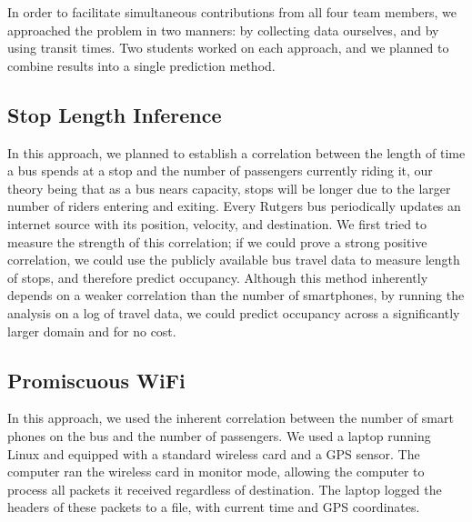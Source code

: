 \documentclass[letterpaper,abstract=on,titlepage=false]{scrreprt}
\begin{document}
In order to facilitate simultaneous contributions from all four team members, we approached the problem in two manners: by collecting data ourselves, and by using transit times.
Two students worked on each approach, and we planned to combine results into a single prediction method.

	\subsection*{Stop Length Inference}

	In this approach, we planned to establish a correlation between the length of time a bus spends at a stop and the number of passengers currently riding it, our theory being that as a bus nears capacity, stops will be longer due to the larger number of riders entering and exiting.
	Every Rutgers bus periodically updates an internet source with its position, velocity, and destination.
	We first tried to measure the strength of this correlation; if we could prove a strong positive correlation, we could use the publicly available bus travel data to measure length of stops, and therefore predict occupancy.
	Although this method inherently depends on a weaker correlation than the number of smartphones, by running the analysis on a log of travel data, we could predict occupancy across a significantly larger domain and for no cost.

	\subsection*{Promiscuous WiFi}

	In this approach, we used the inherent correlation between the number of smart phones on the bus and the number of passengers.
	We used a laptop running Linux and equipped with a standard wireless card and a GPS sensor.
	The computer ran the wireless card in monitor mode, allowing the computer to process all packets it received regardless of destination.
	The laptop logged the headers of these packets to a file, with current time and GPS coordinates.
\end{document}
